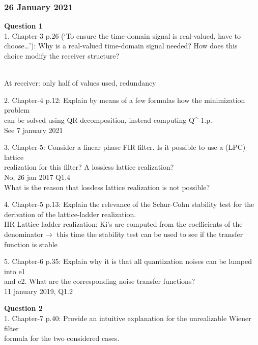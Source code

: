 \documentclass[
  a4paper,
  ,captions=tableheading
]{scrartcl}
\begin{document}
\subsubsection{}\label{section}

\subsubsection{\texorpdfstring{\textbf{26 January
2021}}{26 January 2021}}\label{january-2021}

\textbf{Question 1}\\
1. Chapter-3 p.26 (`To ensure the time-domain signal is real-valued,
have to\\
choose\ldots{}'): Why is a real-valued time-domain signal needed? How
does this\\
choice modify the receiver structure?\\
\strut \\
At receiver: only half of values used, redundancy

2. Chapter-4 p.12: Explain by means of a few formulas how the
minimization problem\\
can be solved using QR-decomposition, instead computing Q\^{}-1.p.\\
See 7 january 2021

3. Chapter-5: Consider a linear phase FIR filter. Is it possible to use
a (LPC) lattice\\
realization for this filter? A lossless lattice realization?\\
No, 26 jan 2017 Q1.4\\
What is the reason that lossless lattice realization is not possible?

4. Chapter-5 p.13: Explain the relevance of the Schur-Cohn stability
test for the\\
derivation of the lattice-ladder realization.\\
IIR Lattice ladder realization: Ki's are computed from the coefficients
of the denominator\(\rightarrow\) this time the stability test can be
used to see if the transfer function is stable

5. Chapter-6 p.35: Explain why it is that all quantization noises can be
lumped into e1\\
and e2. What are the corresponding noise transfer functions?\\
11 january 2019, Q1.2

\textbf{Question 2}\\
1. Chapter-7 p.40: Provide an intuitive explanation for the unrealizable
Wiener filter\\
formula for the two considered cases.
\end{document}
